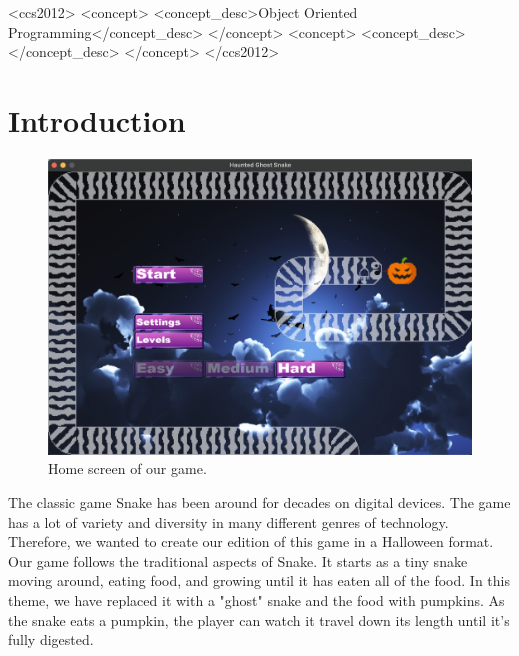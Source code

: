 \documentclass[sigplan,screen]{acmart}
\begin{document}
\begin{CCSXML}
<ccs2012>
 <concept>
  <concept_desc>Object Oriented Programming</concept_desc>
 </concept>
 <concept>
  <concept_desc></concept_desc>
 </concept>
</ccs2012>
\end{CCSXML}



\maketitle


\section{Introduction}
\begin{figure}[h]
  \centering
  \includegraphics[width=\linewidth]{game_home}
  \caption{Home screen of our game. }
\end{figure}
The classic game Snake has been around for decades on digital devices. The game has a lot of variety and diversity in many different genres of technology. Therefore, we wanted to create our edition of this game in a Halloween format. Our game follows the traditional aspects of Snake. It starts as a tiny snake moving around, eating food, and growing until it has eaten all of the food. In this theme, we have replaced it with a "ghost" snake and the food with pumpkins. As the snake eats a pumpkin, the player can watch it travel down its length until it's fully digested. 
\end{document}
